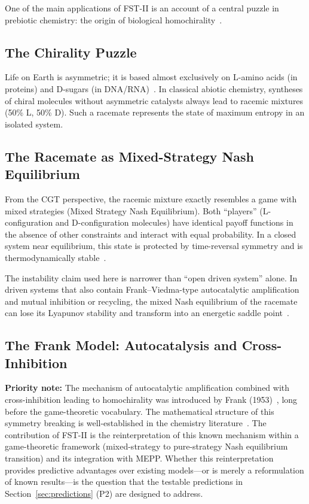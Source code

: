 \documentclass[12pt,a4paper]{article}
\theoremstyle{remark}
\begin{document}
One of the main applications of FST-II is an account of a central puzzle in prebiotic chemistry: the origin of biological homochirality~\citep{Blackmond2010,Biochirality}.

\subsection{The Chirality Puzzle}

Life on Earth is asymmetric; it is based almost exclusively on L-amino acids (in proteins) and D-sugars (in DNA/RNA)~\citep{HomochiralityThermo}. In classical abiotic chemistry, syntheses of chiral molecules without asymmetric catalysts always lead to racemic mixtures (50\% L, 50\% D). Such a racemate represents the state of maximum entropy in an isolated system.

\subsection{The Racemate as Mixed-Strategy Nash Equilibrium}

From the CGT perspective, the racemic mixture exactly resembles a game with mixed strategies (Mixed Strategy Nash Equilibrium). Both ``players'' (L-configuration and D-configuration molecules) have identical payoff functions in the absence of other constraints and interact with equal probability. In a closed system near equilibrium, this state is protected by time-reversal symmetry and is thermodynamically stable~\citep{PlassonReview2007,TimeReversalSymmetry}.

The instability claim used here is narrower than ``open driven system'' alone. In driven systems that also contain Frank--Viedma-type autocatalytic amplification and mutual inhibition or recycling, the mixed Nash equilibrium of the racemate can lose its Lyapunov stability and transform into an energetic saddle point~\citep{Frank1953,PlassonReview2007}.

\subsection{The Frank Model: Autocatalysis and Cross-Inhibition}

\textbf{Priority note:} The mechanism of autocatalytic amplification combined with cross-inhibition leading to homochirality was introduced by Frank (1953)~\citep{Frank1953}, long before the game-theoretic vocabulary. The mathematical structure of this symmetry breaking is well-established in the chemistry literature~\citep{PlassonReview2007}. The contribution of FST-II is the reinterpretation of this known mechanism within a game-theoretic framework (mixed-strategy to pure-strategy Nash equilibrium transition) and its integration with MEPP. Whether this reinterpretation provides predictive advantages over existing models---or is merely a reformulation of known results---is the question that the testable predictions in Section~\ref{sec:predictions} (P2) are designed to address.
\end{document}
